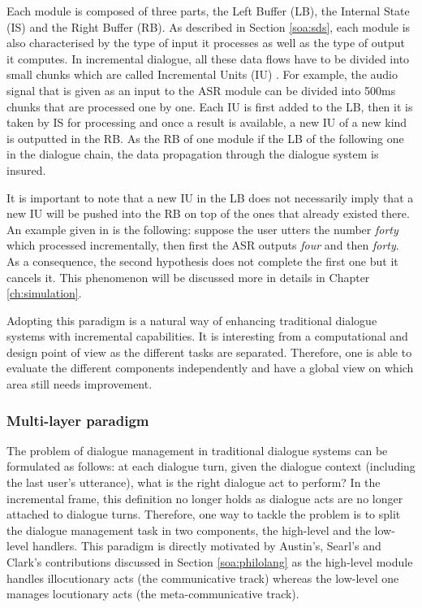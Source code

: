 			Each module is composed of three parts, the Left Buffer (LB), the Internal State (IS) and the Right Buffer (RB). As described in Section \ref{soa:sds}, each module is also characterised by the type of input it processes as well as the type of output it computes. In incremental dialogue, all these data flows have to be divided into small chunks which are called Incremental Units (IU) \cite{Schlangen2011}. For example, the audio signal that is given as an input to the ASR module can be divided into 500ms chunks that are processed one by one. Each IU is first added to the LB, then it is taken by IS for processing and once a result is available, a new IU of a new kind is outputted in the RB. As the RB of one module if the LB of the following one in the dialogue chain, the data propagation through the dialogue system is insured.
			
			It is important to note that a new IU in the LB does not necessarily imply that a new IU will be pushed into the RB on top of the ones that already existed there. An example given in \cite{Schlangen2011} is the following: suppose the user utters the number \textit{forty} which processed incrementally, then first the ASR outputs \textit{four} and then \textit{forty}. As a consequence, the second hypothesis does not complete the first one but it cancels it. This phenomenon will be discussed more in details in Chapter \ref{ch:simulation}.
			
			Adopting this paradigm is a natural way of enhancing traditional dialogue systems with incremental capabilities. It is interesting from a computational and design point of view as the different tasks are separated. Therefore, one is able to evaluate the different components independently \cite{Baumann2011} and have a global view on which area still needs improvement.

		\subsubsection{Multi-layer paradigm}
		
			The problem of dialogue management in traditional dialogue systems can be formulated as follows: at each dialogue turn, given the dialogue context (including the last user's utterance), what is the right dialogue act to perform? In the incremental frame, this definition no longer holds as dialogue acts are no longer attached to dialogue turns. Therefore, one way to tackle the problem is to split the dialogue management task in two components, the high-level and the low-level handlers. This paradigm is directly motivated by Austin's, Searl's and Clark's contributions discussed in Section \ref{soa:philolang} as the high-level module handles illocutionary acts (the communicative track) whereas the low-level one manages locutionary acts (the meta-communicative track).
				

